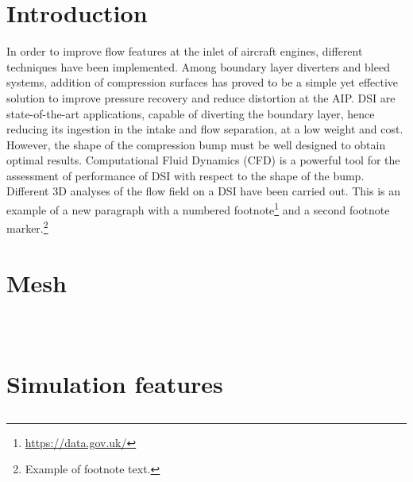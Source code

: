 \documentclass[12pt,a4paper]{article}
\newcommand{\subsubsubsection}[1]{%
  \vspace{\baselineskip}%
  \noindent\textbf{#1\\}\quad%
}
\begin{document}
\vspace{0.15cm}

\section{Introduction}
 In order to improve flow features at the inlet of aircraft engines, different techniques have been implemented. Among boundary layer diverters and bleed systems, addition of compression surfaces has proved to be a simple yet effective solution to improve pressure recovery and reduce distortion at the AIP. DSI are state-of-the-art applications, capable of diverting the boundary layer, hence reducing its ingestion in the intake and flow separation, at a low weight and cost. However, the shape of the compression bump must be well designed to obtain optimal results. Computational Fluid Dynamics (CFD) is a powerful tool for the assessment of performance of DSI with respect to the shape of the bump. Different 3D analyses of the flow field on a DSI have been carried out.
This is an example of a new paragraph with a numbered footnote\footnote{\url{https://data.gov.uk/}} and a second footnote marker.\footnote{Example of footnote text.}

\section{Mesh}\label{sec2}

\subsection{}

\subsection{}\label{subsec1}

\subsubsection{}\label{subsubsec1}

\subsubsubsection{}

\vspace{-1.5cm}
\section{Simulation features}\label{sec3}

\subsection{}\label{subsec2}
\end{document}
